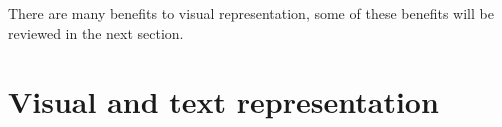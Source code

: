 
There are many benefits to visual representation, some of these benefits will be reviewed in the next section.
\section{Visual and text representation}\label{ch:visualAndTextRepresentation}








